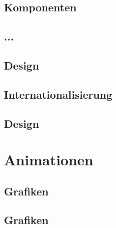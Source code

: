 \subsection{Komponenten}

\subsection{...}

\subsection{Design}

\subsection{Internationalisierung}

\subsection{Design}



\section{Animationen}

\subsection{Grafiken}

\subsection{Grafiken}

